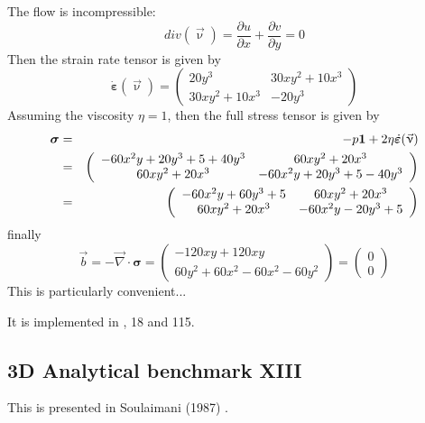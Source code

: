 The flow is incompressible:
\[
div (\vec\upnu) = 
\frac{\partial u }{\partial x}
+
\frac{\partial v }{\partial y}
= 0
\]
Then the strain rate tensor is given by 
\[
\dot{\bm\varepsilon} (\vec\upnu)
=
\left(
\begin{array}{cc}
20y^3 & 30xy^2+10x^3 \\
30xy^2+10x^3 & -20y^3
\end{array}
\right)
\]
Assuming the viscosity $\eta=1$, then the full stress tensor is 
given by
\begin{eqnarray}
{\bm\sigma} 
&=& -p {\bm 1} + 2 \eta \dot{\bm\varepsilon} (\vec\upnu) \nonumber\\
&=&
\left(
\begin{array}{cc}
-60x^2y +20y^3 +5 + 40y^3 & 60xy^2+20x^3 \\
60xy^2+20x^3 & -60x^2y +20y^3 +5 -40y^3
\end{array}
\right) \nonumber\\
&=&
\left(
\begin{array}{cc}
-60x^2y +60y^3 +5  & 60xy^2+20x^3 \\
60xy^2+20x^3 & -60x^2y -20y^3 +5 
\end{array}
\right)
\end{eqnarray}
finally 
\[
\vec{b} 
= -\vec\nabla\cdot \bm\sigma
= 
\left(
\begin{array}{c}
-120xy + 120xy \\
60y^2 + 60x^2 -60x^2 -60y^2
\end{array}
\right)
=
\left(
\begin{array}{c}
0 \\
0
\end{array}
\right)
\]
This is particularly convenient...


It is implemented in , 18 and 115.



\subsection{3D Analytical benchmark XIII}\label{ss:sofo87_3D}

This is presented in Soulaimani \etal (1987) \cite{sofo87}. 

